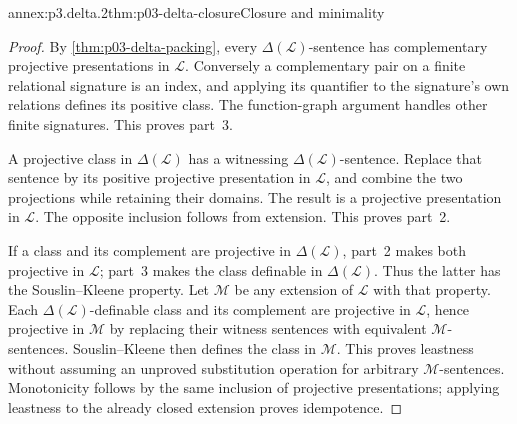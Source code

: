 \begin{annexitem}{annex:p3.delta.2}{thm:p03-delta-closure}{Closure and minimality}
\begin{proof}
By \cref{thm:p03-delta-packing}, every
\(\Delta(\mathcal L)\)-sentence has complementary projective
presentations in \(\mathcal L\). Conversely a complementary pair on
a finite relational signature is an index, and applying its quantifier
to the signature's own relations defines its positive class. The
function-graph argument handles other finite signatures. This proves
part~3.

A projective class in \(\Delta(\mathcal L)\) has a witnessing
\(\Delta(\mathcal L)\)-sentence. Replace that sentence by its
positive projective presentation in \(\mathcal L\), and combine the
two projections while retaining their domains. The result is a
projective presentation in \(\mathcal L\). The opposite inclusion
follows from extension. This proves part~2.

If a class and its complement are projective in
\(\Delta(\mathcal L)\), part~2 makes both projective in
\(\mathcal L\); part~3 makes the class definable in
\(\Delta(\mathcal L)\). Thus the latter has the Souslin--Kleene
property. Let \(\mathcal M\) be any extension of \(\mathcal L\)
with that property. Each \(\Delta(\mathcal L)\)-definable class
and its complement are projective in \(\mathcal L\), hence
projective in \(\mathcal M\) by replacing their witness sentences
with equivalent \(\mathcal M\)-sentences. Souslin--Kleene then
defines the class in \(\mathcal M\). This proves leastness without
assuming an unproved substitution operation for arbitrary
\(\mathcal M\)-sentences. Monotonicity follows by the same inclusion
of projective presentations; applying leastness to the already closed
extension proves idempotence.
\end{proof}
\end{annexitem}
